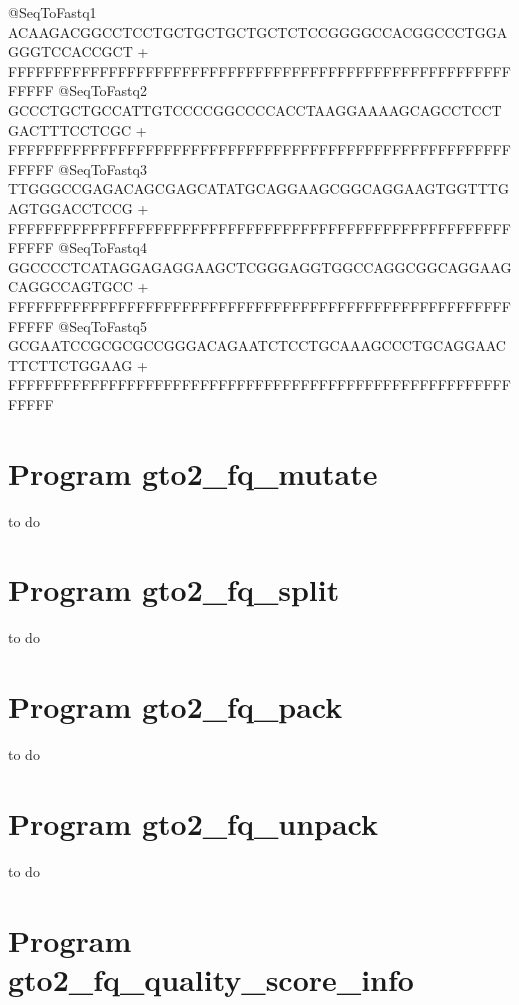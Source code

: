\documentclass[11pt,]{krantz}
\newenvironment{Shaded}{\begin{snugshade}}{\end{snugshade}}
\newcommand{\ExtensionTok}[1]{#1}
\begin{document}
\begin{Shaded}
\begin{Highlighting}[]
\ExtensionTok{@SeqToFastq1}
\ExtensionTok{ACAAGACGGCCTCCTGCTGCTGCTGCTCTCCGGGGCCACGGCCCTGGAGGGTCCACCGCT}
\ExtensionTok{+}
\ExtensionTok{FFFFFFFFFFFFFFFFFFFFFFFFFFFFFFFFFFFFFFFFFFFFFFFFFFFFFFFFFFFF}
\ExtensionTok{@SeqToFastq2}
\ExtensionTok{GCCCTGCTGCCATTGTCCCCGGCCCCACCTAAGGAAAAGCAGCCTCCTGACTTTCCTCGC}
\ExtensionTok{+}
\ExtensionTok{FFFFFFFFFFFFFFFFFFFFFFFFFFFFFFFFFFFFFFFFFFFFFFFFFFFFFFFFFFFF}
\ExtensionTok{@SeqToFastq3}
\ExtensionTok{TTGGGCCGAGACAGCGAGCATATGCAGGAAGCGGCAGGAAGTGGTTTGAGTGGACCTCCG}
\ExtensionTok{+}
\ExtensionTok{FFFFFFFFFFFFFFFFFFFFFFFFFFFFFFFFFFFFFFFFFFFFFFFFFFFFFFFFFFFF}
\ExtensionTok{@SeqToFastq4}
\ExtensionTok{GGCCCCTCATAGGAGAGGAAGCTCGGGAGGTGGCCAGGCGGCAGGAAGCAGGCCAGTGCC}
\ExtensionTok{+}
\ExtensionTok{FFFFFFFFFFFFFFFFFFFFFFFFFFFFFFFFFFFFFFFFFFFFFFFFFFFFFFFFFFFF}
\ExtensionTok{@SeqToFastq5}
\ExtensionTok{GCGAATCCGCGCGCCGGGACAGAATCTCCTGCAAAGCCCTGCAGGAACTTCTTCTGGAAG}
\ExtensionTok{+}
\ExtensionTok{FFFFFFFFFFFFFFFFFFFFFFFFFFFFFFFFFFFFFFFFFFFFFFFFFFFFFFFFFFFF}
\end{Highlighting}
\end{Shaded}

\section{Program gto2\_fq\_mutate}\label{program-gto2_fq_mutate}

to do

\section{Program gto2\_fq\_split}\label{program-gto2_fq_split}

to do

\section{Program gto2\_fq\_pack}\label{program-gto2_fq_pack}

to do

\section{Program gto2\_fq\_unpack}\label{program-gto2_fq_unpack}

to do

\section{Program
gto2\_fq\_quality\_score\_info}\label{program-gto2_fq_quality_score_info}
\end{document}

